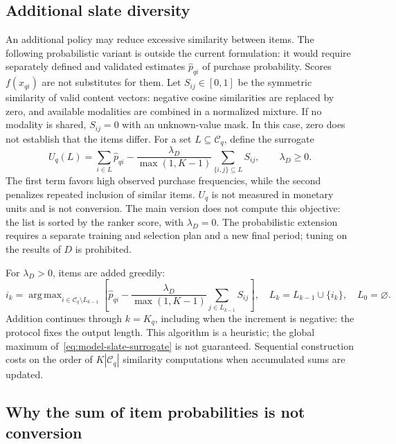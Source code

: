 \documentclass[12pt,a4paper]{article}
\DeclareMathOperator*{\argmax}{arg\,max}
\theoremstyle{plainru}
\begin{document}
\subsection{Additional slate diversity}\label{sec:model-diversity-optional}

An additional policy may reduce excessive similarity between items.
The following probabilistic variant is outside the current formulation:
it would require separately defined and validated estimates
$\widehat p_{qi}$ of purchase probability. Scores $f(x_{qi})$ are not substitutes for them.
Let $S_{ij}\in[0,1]$ be the symmetric similarity of valid
content vectors: negative cosine similarities are replaced by zero,
and available modalities are combined in a normalized mixture.
If no modality is shared, $S_{ij}=0$ with an unknown-value mask.
In this case, zero does not establish that the items differ.
For a set $L\subseteq\mathcal C_q$, define the surrogate
\begin{equation}\label{eq:model-slate-surrogate}
U_q(L)=\sum_{i\in L}\widehat p_{qi}
-\frac{\lambda_D}{\max(1,K-1)}
\sum_{\{i,j\}\subseteq L}S_{ij},\qquad\lambda_D\ge0.
\end{equation}
The first term favors high observed purchase frequencies,
while the second penalizes repeated inclusion of similar items.
$U_q$ is not measured in monetary units and is not conversion.
The main version does not compute this objective: the list is sorted
by the ranker score, with $\lambda_D=0$. The probabilistic extension
requires a separate training and selection plan and a new final period;
tuning on the results of $D$ is prohibited.

For $\lambda_D>0$, items are added greedily:
\begin{equation}\label{eq:model-greedy-slate}
i_k=\argmax_{i\in\mathcal C_q\setminus L_{k-1}}
\left[\widehat p_{qi}-
\frac{\lambda_D}{\max(1,K-1)}\sum_{j\in L_{k-1}}S_{ij}\right],
\quad L_k=L_{k-1}\cup\{i_k\},\quad L_0=\varnothing.
\end{equation}
Addition continues through $k=K_q$, including when the increment
is negative: the protocol fixes the output length.
This algorithm is a heuristic; the global maximum
of~\eqref{eq:model-slate-surrogate} is not guaranteed.
Sequential construction costs on the order of
$K|\mathcal C_q|$ similarity computations when accumulated sums are updated.

\subsection{Why the sum of item probabilities is not conversion}
\end{document}
